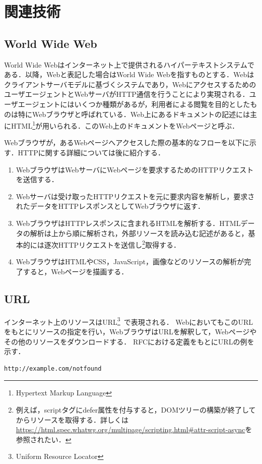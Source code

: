 \newpage
\section{関連技術}
\subsection{World Wide Web}
World Wide Webはインターネット上で提供されるハイパーテキストシステムである．以降，Webと表記した場合はWorld Wide Webを指すものとする．Webはクライアントサーバモデルに基づくシステムであり，WebにアクセスするためのユーザエージェントとWebサーバがHTTP通信を行うことにより実現される．ユーザエージェントにはいくつか種類があるが，利用者による閲覧を目的としたものは特にWebブラウザと呼ばれている．Web上にあるドキュメントの記述には主にHTML\footnote{Hypertext Markup Language}が用いられる．このWeb上のドキュメントをWebページと呼ぶ．

Webブラウザが，あるWebページへアクセスした際の基本的なフローを以下に示す．HTTPに関する詳細については後に紹介する．

\begin{enumerate}
\item WebブラウザはWebサーバにWebページを要求するためのHTTPリクエストを送信する．
\item Webサーバは受け取ったHTTPリクエストを元に要求内容を解析し，要求されたデータをHTTPレスポンスとしてWebブラウザに返す．
\item WebブラウザはHTTPレスポンスに含まれるHTMLを解析する．HTMLデータの解析は上から順に解析され，外部リソースを読み込む記述があると，基本的には逐次HTTPリクエストを送信し\footnote{例えば，scriptタグにdefer属性を付与すると，DOMツリーの構築が終了してからリソースを取得する．詳しくは\url{https://html.spec.whatwg.org/multipage/scripting.html\#attr-script-async}を参照されたい．}取得する．
\item WebブラウザはHTMLやCSS，JavaScript，画像などのリソースの解析が完了すると，Webページを描画する．
\end{enumerate}

\subsection{URL}
インターネット上のリソースはURL\footnote{Uniform Resource Locator}~\cite{rfc1738,rfc3986,url_ls}で表現される．
WebにおいてもこのURLをもとにリソースの指定を行い，WebブラウザはURLを解釈して，Webページやその他のリソースをダウンロードする．
RFCにおける定義をもとにURLの例を示す．

\begin{verbatim}
http://example.com/notfound
\end{verbatim}


